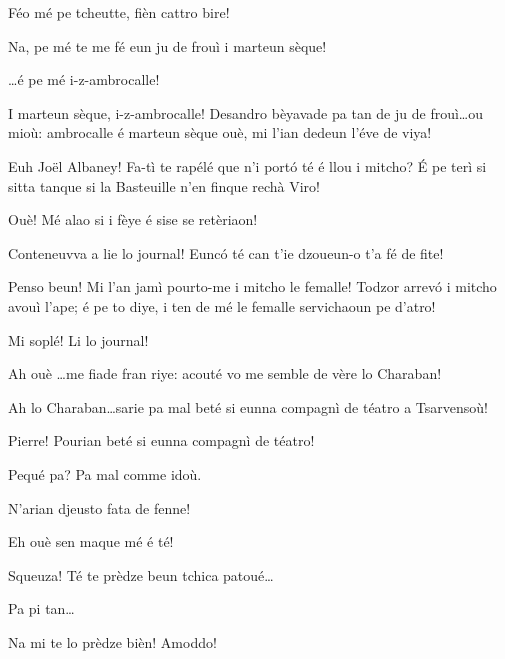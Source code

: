 \begin{drama}
\Pierrespeaks Féo mé pe tcheutte, fièn cattro bire!

\Francescaspeaks  Na, pe mé te me fé eun ju de frouì i marteun sèque!

\Joellespeaks \ldots é pe mé i-z-ambrocalle!

\Joelspeaks{} I marteun sèque, i-z-ambrocalle! Desandro bèyavade pa tan de ju de frouì\ldots ou mioù: ambrocalle é marteun sèque ouè, mi l'ian dedeun l'éve de viya!


\Francescaspeaks Euh Jo\"{e}l Albaney! Fa-tì te rapélé que n'i portó té é llou  i mitcho? \'E pe terì si sitta tanque si la Basteuille n'en finque rechà Viro!

\Vetchotspeaks Ouè! Mé alao si i fèye é sise se retèriaon!

\Pierrespeaks{} Conteneuvva a lie lo journal! Euncó té can t'ie dzoueun-o t'a fé de fite!

\Vetchotspeaks Penso beun! Mi l'an jamì pourto-me i mitcho le femalle! Todzor arrevó i mitcho avouì l’ape; é pe to diye, i ten de mé le femalle servichaoun pe d’atro!

\Joelspeaks Mi soplé! Li lo journal!


\Serventaspeaks Ah ouè \ldots me fiade fran riye: acouté vo me semble de vère lo Charaban!


\Joellespeaks Ah lo Charaban\ldots sarie pa mal beté si eunna compagnì de téatro a Tsarvensoù!

\Joelspeaks Pierre! Pourian beté si eunna compagnì de téatro!
 
\Pierrespeaks Pequé pa? Pa mal comme idoù. 

\Joelspeaks{} N'arian djeusto fata de fenne!

\Pierrespeaks Eh ouè sen maque mé é té!


\Pierrespeaks{} Squeuza! Té te prèdze beun tchica patoué\ldots

\Serventaspeaks  Pa pi tan\ldots

\Joelspeaks Na mi te lo prèdze bièn! Amoddo!


\end{drama}

